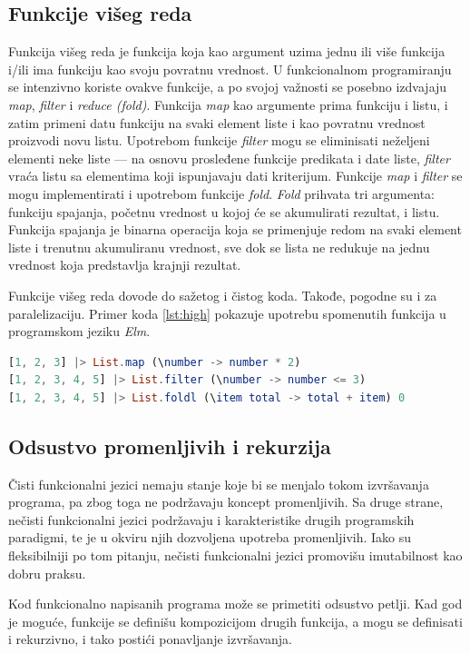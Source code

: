 \documentclass[12pt,oneside]{memoir}
\begin{document}
\subsection{Funkcije višeg reda}
\par Funkcija višeg reda je funkcija koja kao argument uzima jednu ili više funkcija i/ili ima funkciju kao svoju povratnu vrednost. U funkcionalnom programiranju se intenzivno koriste ovakve funkcije, a po svojoj važnosti se posebno izdvajaju \textit{map}, \textit{filter} i \textit{reduce (fold)}.  Funkcija \textit{map} kao argumente prima funkciju i listu, i zatim primeni datu funkciju na svaki element liste i kao povratnu vrednost proizvodi novu listu. Upotrebom funkcije \textit{filter} mogu se eliminisati neželjeni elementi neke liste --- na osnovu prosleđene funkcije predikata i date liste, \textit{filter} vraća listu sa elementima koji ispunjavaju dati kriterijum. Funkcije \emph{map} i \emph{filter} se mogu implementirati i upotrebom funkcije \emph{fold}. \textit{Fold} prihvata tri argumenta: funkciju spajanja, početnu vrednost u kojoj će se akumulirati rezultat, i listu. Funkcija spajanja je binarna operacija koja se primenjuje redom na svaki element liste i trenutnu akumuliranu vrednost, sve dok se lista ne redukuje na jednu vrednost koja predstavlja krajnji rezultat. 
\par Funkcije višeg reda dovode do sažetog i čistog koda. Takođe, pogodne su i za paralelizaciju. Primer koda \ref{lst:high} pokazuje upotrebu spomenutih funkcija u programskom jeziku \emph{Elm}.

\begin{minipage}{\linewidth}
\begin{lstlisting}[language=elm, basicstyle=\small, caption={Funkcije višeg reda},captionpos=b, label={lst:high}]
[1, 2, 3] |> List.map (\number -> number * 2) 
[1, 2, 3, 4, 5] |> List.filter (\number -> number <= 3) 
[1, 2, 3, 4, 5] |> List.foldl (\item total -> total + item) 0 
\end{lstlisting}
\end{minipage}

\subsection{Odsustvo promenljivih i rekurzija}
\par Čisti funkcionalni jezici nemaju stanje koje bi se menjalo tokom izvršavanja programa, pa zbog toga ne podržavaju koncept promenljivih. Sa druge strane, nečisti funkcionalni jezici podržavaju i karakteristike drugih programskih paradigmi, te je u okviru njih dozvoljena upotreba promenljivih. Iako su fleksibilniji po tom pitanju, nečisti funkcionalni jezici promovišu imutabilnost kao dobru praksu. 
\par Kod funkcionalno napisanih programa može se primetiti odsustvo petlji. Kad god je moguće, funkcije se definišu kompozicijom drugih funkcija, a mogu se definisati i rekurzivno, i tako postići ponavljanje izvršavanja.
\end{document}
